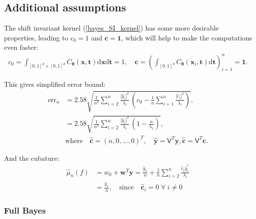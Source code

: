 \documentclass[smallextended]{svjour3}       %
\newcommand{\bm}[1]{\boldsymbol{#1}}
\newcommand{\dif}[1]{\text{d}{#1}}
\newcommand{\vtheta}{{\bm{\theta}}}
\newcommand{\vc}{\bm{c}}
\newcommand{\vt}{\bm{t}}
\newcommand{\vw}{\bm{w}}
\newcommand{\vx}{\bm{x}}
\newcommand{\dvx}{\dif{\bm{x}}}
\newcommand{\dvt}{\dif{\bm{t}}}
\newcommand{\vy}{\bm{y}}
\newcommand{\vone}{\bm{1}}
\newcommand{\mV}{\mathsf{V}}
\newcommand{\hmu}{\hat{\mu}}
\newcommand{\errn}{\text{err}_{n}}
\def\abs#1{\ensuremath{\left \lvert #1 \right \rvert}}
\begin{document}
\subsection{Additional assumptions}
The shift invariant kernel (\ref{bayes_SI_kernel}) has some more desirable properties, leading to $c_0=1$ and $\vc = \vone$, which will help to make the computations even faster:
\begin{align*}
\displaystyle
c_0 =\int_{[0,1]^d\times [0,1]^d}C_\vtheta(\vx,\vt) \dvx \dvt = 1, \quad \vc = \left( \int_{[0,1]^d}C_\vtheta(\vx_i,\vt) \dvt\right)_{i=1}^n = \vone .
\end{align*}

This gives simplified error bound:
\begin{align*}
\errn &=
2.58\sqrt{
\frac {1}{n^2} \sum_{i=2}^{n} \frac{\abs{\widehat{y}_i}^2}{\lambda_i}  
\,
\left( c_0 - \frac 1n \sum_{i=1}^n \frac{\abs{\widehat{c}_i}^2}{\lambda_i} \right) 
}, 
\\
&= 
2.58\sqrt{
\frac {1}{n^2} \sum_{i=2}^{n} \frac{\abs{\widehat{y}_i}^2}{\lambda_i}  
\,
\left( 1 - \frac{n}{\lambda_1}  \right) 
}, 
\\
& \text{where} \quad \widehat{\vc} = (n,0,...,0)^T, \quad 
\widehat{\vy} = \mV^T \vy,  
\widehat{\vc} = \mV^T \vc. 
\end{align*}


And the cubature:
\begin{align*}
\nonumber
\hmu_n(f) &= w_0 + \vw^T \vy 
= 
\frac{\widehat{y}_1}{n} +
\frac 1n \sum_{i=2}^n \frac{ \widehat{c}_i \widehat{y}_i^*}{\lambda_i} \\
& = \frac{\widehat{y}_1}{n}, \quad \text{since} \quad
 \widehat{\vc}_i=0 \; \forall \; i \neq 0
\end{align*}





\subsubsection{Full Bayes}
\end{document}
